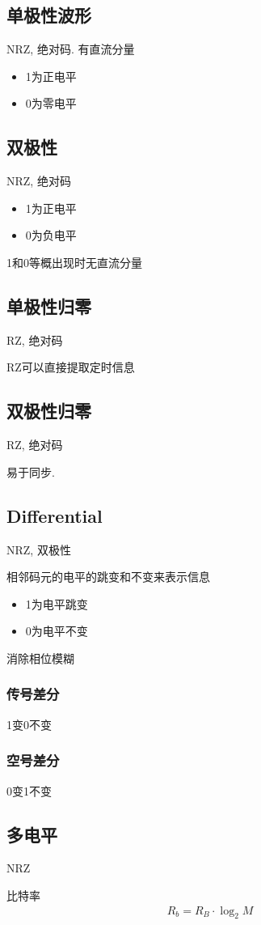 \documentclass[a4paper]{report}
\begin{document}
\subsection{单极性波形}
NRZ, 绝对码. 有直流分量
\begin{itemize}
  \item 1为正电平
  \item 0为零电平
\end{itemize}
\subsection{双极性}
NRZ, 绝对码
\begin{itemize}
  \item 1为正电平
  \item 0为负电平
\end{itemize}
1和0等概出现时无直流分量
\subsection{单极性归零}
RZ, 绝对码

RZ可以直接提取定时信息
\subsection{双极性归零}
RZ, 绝对码

易于同步. 
\subsection{Differential}
NRZ, 双极性

相邻码元的电平的跳变和不变来表示信息
\begin{itemize}
  \item 1为电平跳变
  \item 0为电平不变
\end{itemize}
消除相位模糊
\subsubsection{传号差分}
1变0不变
\subsubsection{空号差分}
0变1不变
\subsection{多电平}
NRZ

比特率
\begin{align*}
  R_b=R_B\cdot \log_2{M}
\end{align*}
\end{document}
